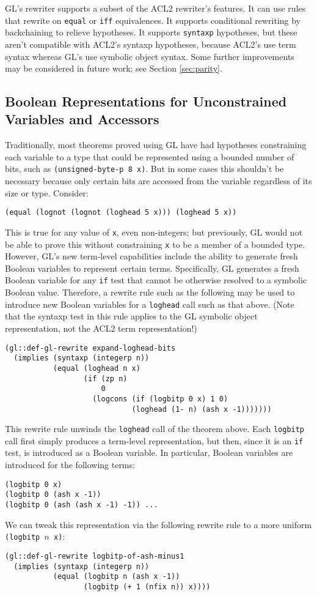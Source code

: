 \documentclass[submission,copyright,creativecommons]{eptcs}
\begin{document}
GL's rewriter supports a subset of the ACL2 rewriter's features.  It
can use rules that rewrite on \texttt{equal} or \texttt{iff}
equivalences.  It supports conditional rewriting by backchaining to
relieve hypotheses.  It supports \texttt{syntaxp} hypotheses, but
these aren't compatible with ACL2's syntaxp hypotheses, because ACL2's
use term syntax whereas GL's use symbolic object syntax.  Some further
improvements may be considered in future work; see Section
\ref{sec:parity}.


\subsection{Boolean Representations for Unconstrained Variables and Accessors}
\label{sec:vargen}
Traditionally, most theorems proved using GL have had hypotheses
constraining each variable to a type that could be represented using a
bounded number of bits, such as \texttt{(unsigned-byte-p 8 x)}.  But
in some cases this shouldn't be necessary because only certain bits
are accessed from the variable regardless of its size or type.
Consider:
\begin{verbatim}
(equal (lognot (lognot (loghead 5 x))) (loghead 5 x))
\end{verbatim}
This is true for any value of \texttt{x}, even non-integers; but
previously, GL would not be able to prove this without constraining
\texttt{x} to be a member of a bounded type.  However, GL's new
term-level capabilities include the ability to generate fresh Boolean
variables to represent certain terms.  Specifically, GL generates a
fresh Boolean variable for any \texttt{if} test that cannot be
otherwise resolved to a symbolic Boolean value.  Therefore, a rewrite
rule such as the following may be used to introduce new Boolean
variables for a \texttt{loghead} call such as that above.  (Note that the
syntaxp test in this rule applies to the GL symbolic object
representation, not the ACL2 term representation!)
\begin{verbatim}
(gl::def-gl-rewrite expand-loghead-bits
  (implies (syntaxp (integerp n))
           (equal (loghead n x)
                  (if (zp n)
                      0
                    (logcons (if (logbitp 0 x) 1 0)
                             (loghead (1- n) (ash x -1)))))))
\end{verbatim}
This rewrite rule unwinds the \texttt{loghead} call of the theorem
above.  Each \texttt{logbitp} call first simply produces a term-level
representation, but then, since it is an \texttt{if} test, is
introduced as a Boolean variable.  In particular, Boolean variables
are introduced for the following terms:
\begin{verbatim}
(logbitp 0 x)
(logbitp 0 (ash x -1))
(logbitp 0 (ash (ash x -1) -1)) ...
\end{verbatim}
We can tweak this representation via the following rewrite rule to a more uniform \texttt{(logbitp $n$ x)}:
\begin{verbatim}
(gl::def-gl-rewrite logbitp-of-ash-minus1
  (implies (syntaxp (integerp n))
           (equal (logbitp n (ash x -1))
                  (logbitp (+ 1 (nfix n)) x))))
\end{verbatim}
\end{document}
